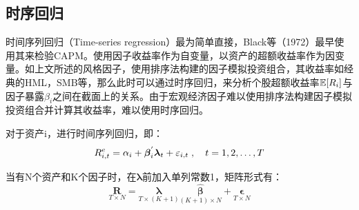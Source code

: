 \documentclass[11pt]{article}
\begin{document}
\subsection{时序回归}

时间序列回归（Time-series regression）最为简单直接，Black等（1972）最早使用其来检验CAPM。使用因子收益率作为自变量，以资产的超额收益率作为因变量。如上文所述的风格因子，使用排序法构建的因子模拟投资组合，其收益率如经典的HML，SMB等，那么此时可以通过时序回归，来分析个股超额收益率$\mathbb{E}[R_i]$与因子暴露$\beta_i$之间在截面上的关系。由于宏观经济因子难以使用排序法构建因子模拟投资组合并计算其收益率，难以使用时序回归。

对于资产i，进行时间序列回归，即：
\begin{equation*}
    R_{i,t}^{e} = \alpha_i + \bm{\beta}_{i}^{'} \bm{\lambda}_t + \varepsilon_{i,t} \;,\quad t=1,2,\dots,T
\end{equation*}

当有N个资产和K个因子时，在$\bm{\lambda}$前加入单列常数1，矩阵形式有：
\begin{equation*}
    \underset{T \times N}{\bm{R}} = \underset{ T \times (K+1)}{\bm{\lambda}} \underset{(K+1) \times N}{\hat{\bm{\beta}}} + \underset{T \times N}{\bm{\epsilon}}
\end{equation*}
\end{document}
